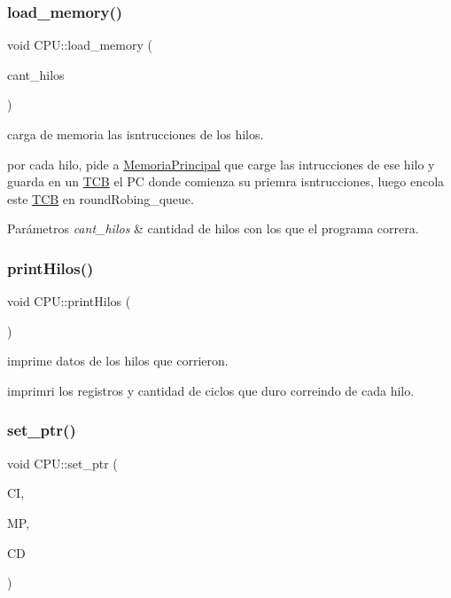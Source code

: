 \subsubsection{\texorpdfstring{load\+\_\+memory()}{load\_memory()}}
{\footnotesize\ttfamily void C\+P\+U\+::load\+\_\+memory (\begin{DoxyParamCaption}\item[{int}]{cant\+\_\+hilos }\end{DoxyParamCaption})}



carga de memoria las isntrucciones de los hilos. 

por cada hilo, pide a \hyperlink{classMemoriaPrincipal}{Memoria\+Principal} que carge las intrucciones de ese hilo y guarda en un \hyperlink{structTCB}{T\+CB} el PC donde comienza su priemra isntrucciones, luego encola este \hyperlink{structTCB}{T\+CB} en round\+Robing\+\_\+queue. 
\begin{DoxyParams}{Parámetros}
{\em cant\+\_\+hilos} & cantidad de hilos con los que el programa correra. \\
\hline
\end{DoxyParams}
\mbox{\label{classCPU_a5f109b7be44b7f800938c3de9ebbc2a4}} 
\subsubsection{\texorpdfstring{print\+Hilos()}{printHilos()}}
{\footnotesize\ttfamily void C\+P\+U\+::print\+Hilos (\begin{DoxyParamCaption}{ }\end{DoxyParamCaption})}



imprime datos de los hilos que corrieron. 

imprimri los registros y cantidad de ciclos que duro correindo de cada hilo. \mbox{\label{classCPU_ac1b30c01a5d6d8cc5410b397747375f7}} 
\subsubsection{\texorpdfstring{set\+\_\+ptr()}{set\_ptr()}}
{\footnotesize\ttfamily void C\+P\+U\+::set\+\_\+ptr (\begin{DoxyParamCaption}\item[{\hyperlink{classCacheInstrucciones}{Cache\+Instrucciones} $\ast$}]{CI,  }\item[{\hyperlink{classMemoriaPrincipal}{Memoria\+Principal} $\ast$}]{MP,  }\item[{\hyperlink{classCacheDatos}{Cache\+Datos} $\ast$}]{CD }\end{DoxyParamCaption})}



